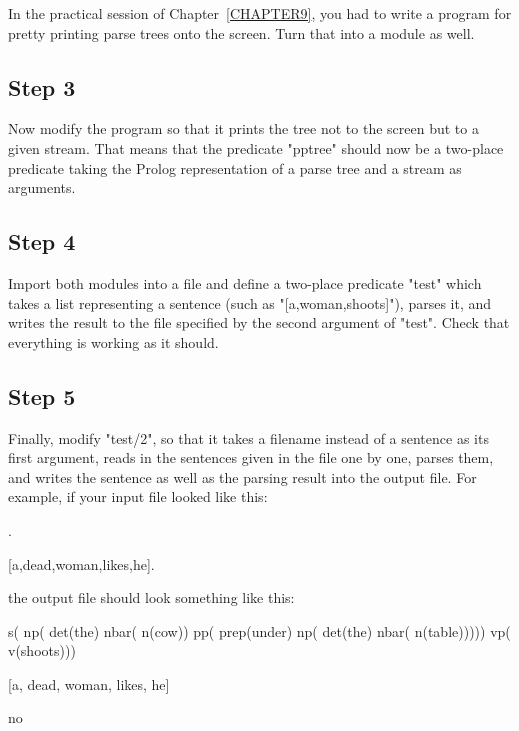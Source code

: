 In the practical session of Chapter~\ref{CHAPTER9}, you
had to write a program for pretty printing parse trees onto the
screen. Turn that into a module as well.



\subsection*{Step 3}\label{L12.PRAXIS.STEP3}

Now modify the program so that it prints the tree not to the
screen but to a given stream. That means that the predicate
"pptree" should now be a two-place predicate taking the Prolog
representation of a parse tree and a stream as arguments.




\subsection*{Step 4}\label{L12.PRAXIS.STEP4}

Import both modules into a file and define a two-place predicate
"test" which takes a list representing a sentence (such as
"[a,woman,shoots]"), parses it,  and writes the result to the file
specified by the second argument of "test".
Check that everything is working as it should.



\subsection*{Step 5}\label{L12.PRAXIS.STEP5}

Finally, modify "test/2", so that it takes a filename instead of a
sentence as its first argument, reads in the sentences given in the
file one by one, parses them, and writes the sentence as well as the
parsing result into the output file. For example, if your input file
looked like this:
\begin{LPNcodedisplay}
.

[a,dead,woman,likes,he].
\end{LPNcodedisplay}

the output file should look something like this:
\begin{LPNcodedisplay}

   s(
      np(
         det(the)
         nbar(
            n(cow))
         pp(
            prep(under)
            np(
               det(the)
               nbar(
                  n(table)))))
      vp(
         v(shoots)))


[a, dead, woman, likes, he]

no
\end{LPNcodedisplay}



